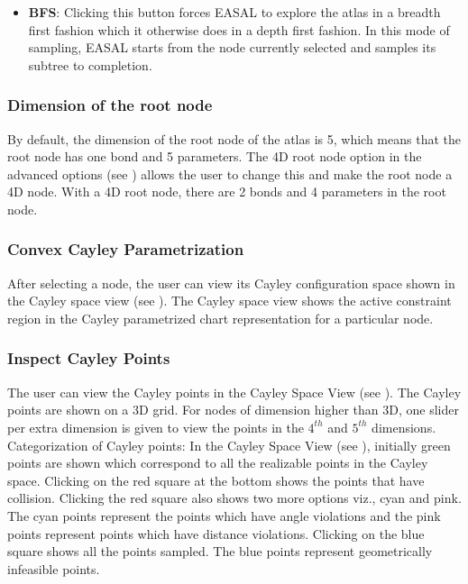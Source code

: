 \documentclass[10pt]{article}
\begin{document}
\begin{itemize}
\item \textbf{BFS}: Clicking this button forces EASAL to explore the atlas in a
breadth first fashion which it otherwise does in a depth first fashion. In this
mode of sampling, EASAL starts from the node currently selected and samples its
subtree to completion.

\end{itemize}




\subsubsection{Dimension of the root node}
By default, the dimension of the root node of the atlas is 5, which means that
the root node has one bond and 5 parameters. The 4D root node option in the
advanced options (see ) allows the user to change this
and make the root node a 4D node. With a 4D root node, there are 2 bonds and 4
parameters in the root node.



\subsubsection{Convex Cayley Parametrization}
After selecting a node, the user can view its Cayley configuration space shown
in the Cayley space view (see ). The Cayley space view
shows the active constraint region in the Cayley parametrized chart
representation for a particular node.




\subsubsection{Inspect Cayley Points}
The user can view the Cayley points in the Cayley Space View (see
). The Cayley points are shown on a 3D grid. For nodes
of dimension higher than 3D, one slider per extra dimension is given to view
the points in the $4^{th}$ and $5^{th}$ dimensions.  Categorization of Cayley
points: In the Cayley Space View (see ), initially
green points are shown which correspond to all the realizable points in the
Cayley space. Clicking on the red square at the bottom shows the points that
have collision. Clicking the red square also shows two more options viz., cyan
and pink. The cyan points represent the points which have angle violations and
the pink points represent points which have distance violations. Clicking on
the blue square shows all the points sampled. The blue points represent
geometrically infeasible points.
\end{document}
